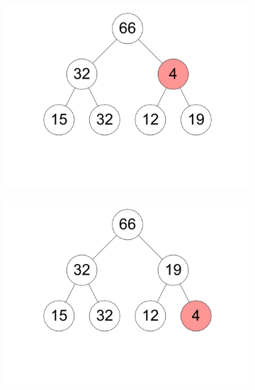 \documentclass[11pt,a4paper]{article}
\begin{document}
\begin{loesung}
\begin{enumerate}
\begin{figure}[h!]
\begin{subfigure}[b]{0.23\textwidth}
                \centering
                \includegraphics[width=\textwidth]{img/b3}
            \end{subfigure}
            \begin{subfigure}[b]{0.23\textwidth}
                \centering
                \includegraphics[width=\textwidth]{img/b5}
            \end{subfigure}
            \\
            \begin{subfigure}[b]{0.23\textwidth}
                \centering

\end{subfigure}
\end{figure}
\end{enumerate}
\end{loesung}
\end{document}
